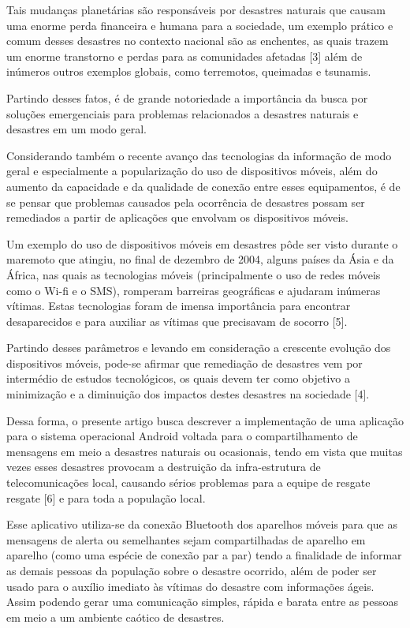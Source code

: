 \documentclass[conference]{IEEEtran}
\begin{document}
Tais mudanças planetárias são responsáveis por desastres naturais que causam uma enorme perda financeira e humana para a sociedade, um exemplo prático e comum desses desastres no contexto nacional são as enchentes, as quais trazem um enorme transtorno e perdas para as comunidades afetadas [3] além de inúmeros outros exemplos globais, como terremotos, queimadas e tsunamis. 

Partindo desses fatos, é de grande notoriedade a importância da busca por soluções emergenciais para problemas relacionados a desastres naturais e desastres em um modo geral.  

Considerando também o recente avanço das tecnologias da informação de modo geral e especialmente a popularização do uso de dispositivos móveis, além do aumento da capacidade e da qualidade de conexão entre esses equipamentos, é de se pensar que problemas causados pela ocorrência de desastres possam ser remediados a partir de aplicações que envolvam os dispositivos móveis.

Um exemplo do uso de dispositivos móveis em desastres pôde ser visto durante o maremoto que atingiu, no final de dezembro de 2004, alguns países da Ásia e da África, nas quais as tecnologias móveis (principalmente o uso de redes móveis como o Wi-fi e o SMS), romperam barreiras geográficas e ajudaram inúmeras vítimas. Estas tecnologias foram de imensa importância  para encontrar desaparecidos e para auxiliar as vítimas que precisavam de socorro [5].

Partindo desses parâmetros e levando em consideração a crescente evolução dos dispositivos móveis, pode-se afirmar que remediação de desastres vem por intermédio de estudos tecnológicos, os quais devem ter como objetivo a minimização e a diminuição dos impactos destes desastres na sociedade [4]. 

Dessa forma, o presente artigo busca descrever a implementação de uma aplicação para o sistema operacional Android voltada para o compartilhamento de mensagens em meio a desastres naturais ou ocasionais, tendo em vista que muitas vezes esses desastres provocam a destruição da infra-estrutura de telecomunicações local, causando sérios problemas para a equipe de resgate resgate [6] e para toda a população local.

Esse aplicativo utiliza-se da conexão Bluetooth dos aparelhos móveis para que as mensagens de alerta ou semelhantes sejam compartilhadas de aparelho em aparelho (como uma espécie de conexão par a par) tendo a finalidade de informar as demais pessoas da população sobre o desastre ocorrido, além de poder ser usado para o auxílio imediato às vítimas do desastre com informações ágeis. Assim podendo gerar uma comunicação simples, rápida e barata entre as pessoas em meio a um ambiente caótico de desastres.
\end{document}
